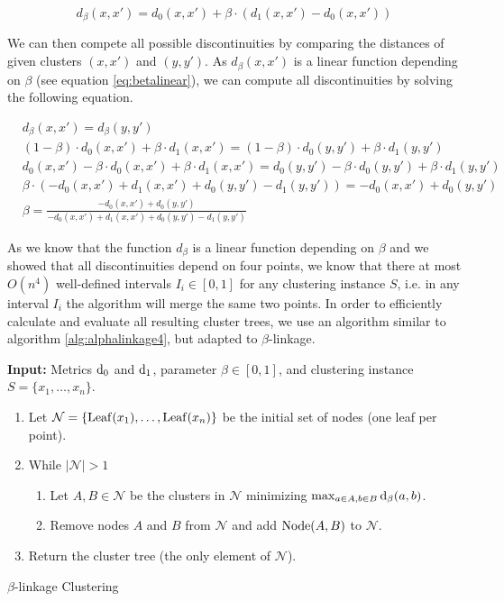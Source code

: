\begin{equation}
d_\beta(x,x') = d_0(x,x') + \beta \cdot (d_1(x,x') - d_0(x,x'))
\label{eq:betalinear}
\end{equation}

We can then compete all possible discontinuities by comparing the distances of given clusters $(x, x')$ and $(y, y')$. As $d_\beta(x,x')$ is a linear function depending on $\beta$ (see equation \ref{eq:betalinear}), we can compute all discontinuities by solving the following equation.

\begin{align*}
&d_\beta(x,x') = d_\beta(y,y')\\
&(1 - \beta) \cdot d_0(x,x') + \beta \cdot d_1(x,x') = (1 - \beta) \cdot d_0(y,y') + \beta \cdot d_1(y,y')\\
&d_0(x,x') - \beta \cdot d_0(x,x') + \beta \cdot d_1(x,x') = d_0(y,y') - \beta \cdot d_0(y,y') + \beta \cdot d_1(y,y')\\
&\beta \cdot (- d_0(x,x') + d_1(x,x') + d_0(y,y') - d_1(y,y')) = - d_0(x,x') + d_0(y,y')\\
&\beta = \frac{- d_0(x,x') + d_0(y,y')}{- d_0(x,x') + d_1(x,x') + d_0(y,y') - d_1(y,y')}
\label{eq:discont}
\end{align*}

As we know that the function $d_\beta$ is a linear function depending on $\beta$ and we showed that all discontinuities depend on four points, we know that there at most $O(n^4)$ well-defined intervals $I_i \in [0,1]$ for any clustering instance $S$, i.e. in any interval $I_i$ the algorithm will merge the same two points. In order to efficiently calculate and evaluate all resulting cluster trees, we use an algorithm similar to algorithm \ref{alg:alphalinkage4}, but adapted to $\beta$-linkage.

\begin{algorithm}
\textbf{Input:} Metrics $\operatorname{d_{0}}$ and $\operatorname{d_{1}}$, parameter $\beta \in [0,1]$, and clustering instance $S = \{x_1, \dots, x_n\}$.
\begin{enumerate}[nosep, leftmargin=*]
\item Let $\mathcal{N} = \{\operatorname{Leaf}(x_1), \dots, \operatorname{Leaf}(x_n)\}$ be the initial set of nodes (one leaf per point).
\item While $|\mathcal{N}| > 1$
\begin{enumerate}[nosep, leftmargin=*]
  \item Let $A, B \in \mathcal{N}$ be the clusters in $\mathcal{N}$ minimizing $\max_{a \in A, b \in B} \operatorname{d_{\beta}}(a, b)$.
  \item Remove nodes $A$ and $B$ from $\mathcal{N}$ and add $\operatorname{Node}(A,B)$ to $\mathcal{N}$.
\end{enumerate}
\item Return the cluster tree (the only element of $\mathcal{N}$).
\end{enumerate}
\caption{$\beta$-linkage Clustering}
\label{alg:betalinkage}
\end{algorithm}

